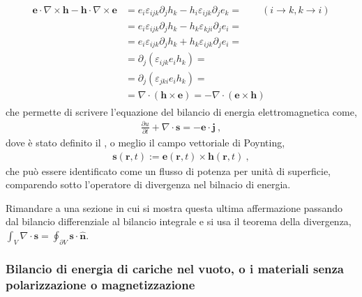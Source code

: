 \documentclass[letterpaper,10pt,italian]{jupyterBook}
\begin{document}
\begin{equation*}
\begin{split}\begin{aligned}
\mathbf{e} \cdot \nabla \times \mathbf{h} - \mathbf{h} \cdot \nabla \times \mathbf{e} & = e_i \varepsilon_{ijk} \partial_j h_k - h_i \varepsilon_{ijk} \partial_j e_k = \qquad (i \rightarrow k, k \rightarrow i)\\
& = e_i \varepsilon_{ijk} \partial_j h_k - h_k \varepsilon_{kji} \partial_j e_i = \\
& = e_i \varepsilon_{ijk} \partial_j h_k + h_k \varepsilon_{ijk} \partial_j e_i = \\
& =  \partial_j (\varepsilon_{ijk} e_i  h_k ) = \\
& =  \partial_j (\varepsilon_{jki} e_i  h_k ) = \\
& = \nabla \cdot (\mathbf{h} \times \mathbf{e}) = - \nabla \cdot (\mathbf{e} \times \mathbf{h})
\end{aligned}\end{split}
\end{equation*}
\sphinxAtStartPar
che permette di scrivere l’equazione del bilancio di energia elettromagnetica come,
\begin{equation*}
\begin{split}\frac{\partial u }{\partial t} + \nabla \cdot \mathbf{s} = - \mathbf{e} \cdot \mathbf{j} \ ,\end{split}
\end{equation*}
\sphinxAtStartPar
dove è stato definito il , o meglio il campo vettoriale di Poynting,
\begin{equation*}
\begin{split}\mathbf{s}(\mathbf{r},t) := \mathbf{e}(\mathbf{r},t) \times \mathbf{h}(\mathbf{r},t) \ ,\end{split}
\end{equation*}
\sphinxAtStartPar
che può essere identificato come un flusso di potenza per unità di superficie, comparendo sotto l’operatore di divergenza nel bilnacio di energia.

\sphinxAtStartPar
{} Rimandare a una sezione in cui si mostra questa ultima affermazione passando dal bilancio differenziale al bilancio integrale e si usa il teorema della divergenza, \(\int_V \nabla \cdot \mathbf{s} = \oint_{\partial V} \mathbf{s} \cdot \hat{\mathbf{n}}\).
\subsubsection*{Bilancio di energia di cariche nel vuoto, o i materiali senza polarizzazione o magnetizzazione}
\end{document}
